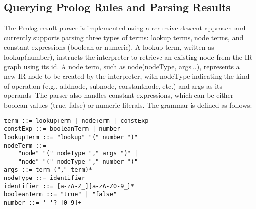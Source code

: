 \subsection{Querying Prolog Rules and Parsing Results}
The Prolog result parser is implemented using a recursive descent approach and currently supports parsing three types of terms: lookup terms, node terms, and constant expressions (boolean or numeric). A lookup term, written as lookup(number), instructs the interpreter to retrieve an existing node from the IR graph using its id. A node term, such as node(nodeType, args...), represents a new IR node to be created by the interpreter, with nodeType indicating the kind of operation (e.g., addnode, subnode, constantnode, etc.) and args as its operands. The parser also handles constant expressions, which can be either boolean values (true, false) or numeric literals. The grammar is defined as follows:
\begin{lstlisting}
term ::= lookupTerm | nodeTerm | constExp  
constExp ::= booleanTerm | number  
lookupTerm ::= "lookup" "(" number ")"  
nodeTerm ::= 
    "node" "(" nodeType "," args ")" | 
    "node" "(" nodeType "," number ")"  
args ::= term ("," term)*  
nodeType ::= identifier
identifier ::= [a-zA-Z_][a-zA-Z0-9_]*  
booleanTerm ::= "true" | "false"  
number ::= '-'? [0-9]+
\end{lstlisting}
